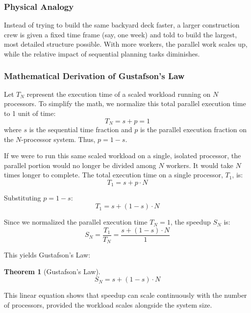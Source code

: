 \documentclass[12pt,a4paper,openany]{book}
\newtheorem{theorem}{Theorem}[chapter]
\begin{document}
\subsubsection{Physical Analogy}
Instead of trying to build the same backyard deck faster, a larger construction crew is given a fixed time frame (say, one week) and told to build the largest, most detailed structure possible. With more workers, the parallel work scales up, while the relative impact of sequential planning tasks diminishes.

\subsubsection{Mathematical Derivation of Gustafson's Law}
Let $T_N$ represent the execution time of a scaled workload running on $N$ processors. To simplify the math, we normalize this total parallel execution time to 1 unit of time:
\begin{equation}
    T_N = s + p = 1
\end{equation}
where $s$ is the sequential time fraction and $p$ is the parallel execution fraction on the $N$-processor system. Thus, $p = 1 - s$.

If we were to run this same scaled workload on a single, isolated processor, the parallel portion would no longer be divided among $N$ workers. It would take $N$ times longer to complete. The total execution time on a single processor, $T_1$, is:
\begin{equation}
    T_1 = s + p \cdot N
\end{equation}

Substituting $p = 1 - s$:
\begin{equation}
    T_1 = s + (1 - s) \cdot N
\end{equation}

Since we normalized the parallel execution time $T_N = 1$, the speedup $S_N$ is:
\begin{equation}
    S_N = \frac{T_1}{T_N} = \frac{s + (1 - s) \cdot N}{1}
\end{equation}

This yields Gustafson's Law:
\begin{theorem}[Gustafson's Law]
    \begin{equation}
        S_N = s + (1 - s) \cdot N
    \end{equation}
\end{theorem}

This linear equation shows that speedup can scale continuously with the number of processors, provided the workload scales alongside the system size.
\end{document}
